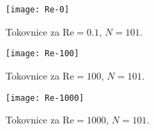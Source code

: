 \documentclass[a4 paper, 12pt]{article}
\renewcommand{\Re}{
    \ensuremath{\mathrm{Re}}
}
\begin{document}
\begin{figure}[H]\centering
    \texttt{[image: Re-0]}
    \caption{Tokovnice za $\Re = 0.1$, $N = 101$.}
    \label{gr1}
\end{figure}

\begin{figure}[H]\centering
    \texttt{[image: Re-100]}
    \caption{Tokovnice za $\Re = 100$, $N = 101$.}
    \label{gr2}
\end{figure}

\begin{figure}[H]\centering
    \texttt{[image: Re-1000]}
    \caption{Tokovnice za $\Re = 1000$, $N = 101$.}
    \label{gr3}
\end{figure}
\end{document}
